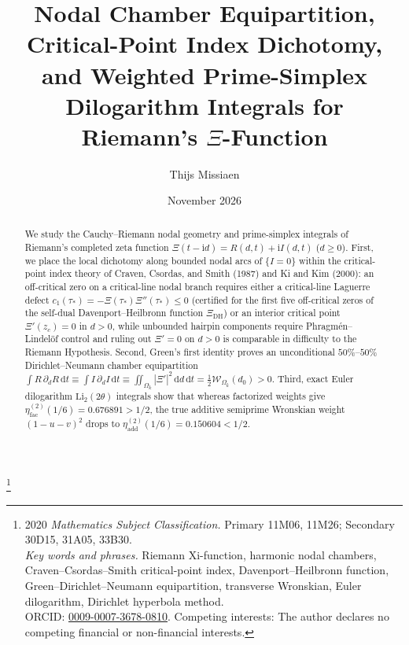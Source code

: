 \documentclass[11pt,reqno]{amsart}
\theoremstyle{definition}
\theoremstyle{remark}
\numberwithin{equation}{section}
\newcommand{\dd}{\mathrm{d}}
\newcommand{\ii}{\mathrm{i}}
\newcommand{\Li}{\mathrm{Li}}
\newcommand{\DHf}{\mathrm{DH}}
\newcommand{\facw}{\mathrm{fac}}
\newcommand{\addw}{\mathrm{add}}
\begin{document}
\sloppy

\title[Nodal Chamber Equipartition, Critical-Point Index, and Dilogarithm Integrals]{Nodal Chamber Equipartition, Critical-Point Index Dichotomy, and Weighted Prime-Simplex Dilogarithm Integrals for Riemann's $\Xi$-Function}

\author{Thijs Missiaen}
\address{Independent Researcher, Belgium}
\thanks{2020 \emph{Mathematics Subject Classification.} Primary 11M06, 11M26; Secondary 30D15, 31A05, 33B30.\\
\emph{Key words and phrases.} Riemann Xi-function, harmonic nodal chambers, Craven--Csordas--Smith critical-point index, Davenport--Heilbronn function, Green--Dirichlet--Neumann equipartition, transverse Wronskian, Euler dilogarithm, Dirichlet hyperbola method.\\
ORCID: \href{https://orcid.org/0009-0007-3678-0810}{0009-0007-3678-0810}. Competing interests: The author declares no competing financial or non-financial interests.}

\date{November 2026}

\begin{abstract}
We study the Cauchy--Riemann nodal geometry and prime-simplex integrals of Riemann's completed zeta function $\Xi(t-\ii d)=R(d,t)+\ii I(d,t)$ ($d\ge 0$). First, we place the local dichotomy along bounded nodal arcs of $\{I=0\}$ within the critical-point index theory of Craven, Csordas, and Smith (1987) and Ki and Kim (2000): an off-critical zero on a critical-line nodal branch requires either a critical-line Laguerre defect $c_1(\tau_*)=-\Xi(\tau_*)\Xi''(\tau_*)\le 0$ (certified for the first five off-critical zeros of the self-dual Davenport--Heilbronn function $\Xi_{\DHf}$) or an interior critical point $\Xi'(z_c)=0$ in $d>0$, while unbounded hairpin components require Phragm\'{e}n--Lindel\"{o}f control and ruling out $\Xi'=0$ on $d>0$ is comparable in difficulty to the Riemann Hypothesis. Second, Green's first identity proves an unconditional $50\%$--$50\%$ Dirichlet--Neumann chamber equipartition $\int R\,\partial_d R\,\dd t \equiv \int I\,\partial_d I\,\dd t \equiv \iint_{\Omega_k}|\Xi'|^2\,\dd d\,\dd t = \frac{1}{2}\mathcal{W}_{\Omega_k}(d_0)>0$. Third, exact Euler dilogarithm $\Li_2(2\theta)$ integrals show that whereas factorized weights give $\eta_{\facw}^{(2)}(1/6)=0.676891>1/2$, the true additive semiprime Wronskian weight $(1-u-v)^2$ drops to $\eta_{\addw}^{(2)}(1/6)=0.150604<1/2$.
\end{abstract}
\end{document}
